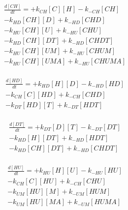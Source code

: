\begin{equation}
\begin{split}
\frac{d[CH]}{dt} =    + k_{CH}[C][H]    - k_{-CH}[CH]     \\%
                      - k_{HD}[CH][D]   + k_{-HD}[CHD]    \\%
                      - k_{HU}[CH][U]   + k_{-HU}[CHU]    \\%
                      - k_{HD}[CH][DT]  + k_{-HD}[CHDT]   \\%
                      - k_{HU}[CH][UM]  + k_{-HU}[CHUM]   \\%
                      - k_{HU}[CH][UMA] + k_{-HU}[CHUMA]  \\%
\end{split}
\end{equation}

\begin{equation}
\begin{split}
\frac{d[HD]}{dt} =    + k_{HD}[H][D]    - k_{-HD}[HD]     \\%
                      - k_{CH}[C][HD]   + k_{-CH}[CHD]    \\%
                      - k_{DT}[HD][T]   + k_{-DT}[HDT]    \\%
\end{split}
\end{equation}

\begin{equation}
\begin{split}
\frac{d[DT]}{dt} =    + k_{DT}[D][T]    - k_{-DT}[DT]     \\%
                      - k_{HD}[H][DT]   + k_{-HD}[HDT]    \\%
                      - k_{HD}[CH][DT]  + k_{-HD}[CHDT]   \\%
\end{split}
\end{equation}

\begin{equation}
\begin{split}
\frac{d[HU]}{dt} =    + k_{HU}[H][U]    - k_{-HU}[HU]     \\%
                      - k_{CH}[C][HU]   + k_{-CH}[CHU]    \\%
                      - k_{UM}[HU][M]   + k_{-UM}[HUM]    \\%
                      - k_{UM}[HU][MA]  + k_{-UM}[HUMA]   \\%
\end{split}
\end{equation}

